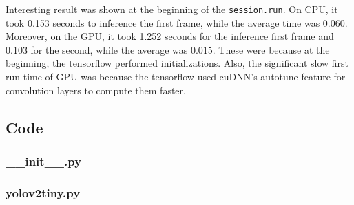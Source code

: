 \documentclass[a4paper,12pt]{article}
\begin{document}
Interesting result was shown at the beginning of the \lstinline{session.run}. On CPU, it took 0.153 seconds to inference the first frame, while the average time was 0.060.
Moreover, on the GPU, it took 1.252 seconds for the inference first frame and 0.103 for the second, while the average was 0.015.
These were because at the beginning, the tensorflow performed initializations. Also, the significant slow first run time of GPU was because the tensorflow used cuDNN’s autotune feature for convolution layers to compute them faster.  


\subsection{Code}
\subsubsection{\_\_init\_\_.py}

\subsubsection{yolov2tiny.py}

\end{document}
